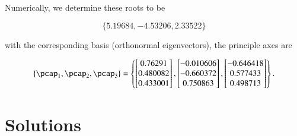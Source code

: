 \begin{Answer}[ref={problem:strain:ps1q2a}]
Numerically, we determine these roots to be

\begin{equation}\label{eqn:continuumProblemSet1:310}
\{5.19684, -4.53206, 2.33522\}
\end{equation}

with the corresponding basis (orthonormal eigenvectors), the principle axes are

\begin{equation}\label{eqn:continuumProblemSet1:330}
\left\{
\pcap_1,
\pcap_2,
\pcap_3
\right\}
=
\left\{
\begin{bmatrix}
0.76291 \\
0.480082 \\
0.433001
\end{bmatrix},
\begin{bmatrix}
-0.010606 \\
-0.660372 \\
0.750863
\end{bmatrix},
\begin{bmatrix}
-0.646418 \\
0.577433 \\
0.498713
\end{bmatrix}
\right\}.
\end{equation}

\end{Answer}

\section{Solutions}

\shipoutAnswer
